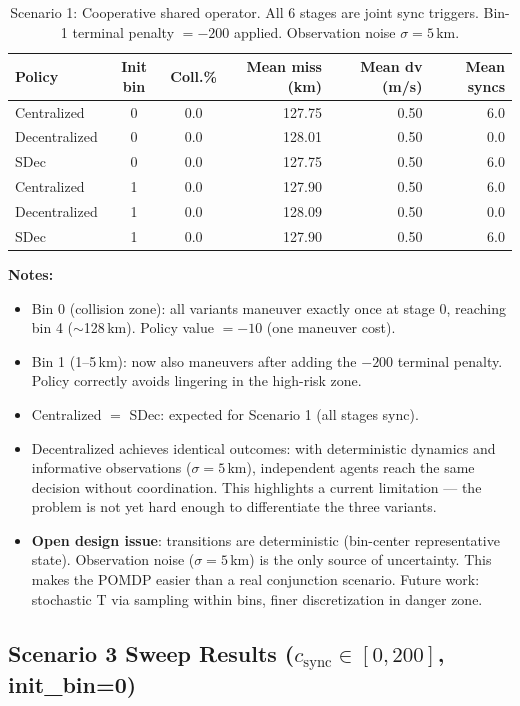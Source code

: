 \documentclass[11pt]{article}
\begin{document}
\begin{table}[h]
\centering
\caption{Scenario 1: Cooperative shared operator. All 6 stages are joint sync triggers.
  Bin-1 terminal penalty $= -200$ applied. Observation noise $\sigma = 5$\,km.}
\begin{tabular}{lccrrr}
\toprule
Policy & Init bin & Coll.\% & Mean miss (km) & Mean dv (m/s) & Mean syncs \\
\midrule
Centralized   & 0 & 0.0 & 127.75 & 0.50 & 6.0 \\
Decentralized & 0 & 0.0 & 128.01 & 0.50 & 0.0 \\
SDec          & 0 & 0.0 & 127.75 & 0.50 & 6.0 \\
\midrule
Centralized   & 1 & 0.0 & 127.90 & 0.50 & 6.0 \\
Decentralized & 1 & 0.0 & 128.09 & 0.50 & 0.0 \\
SDec          & 1 & 0.0 & 127.90 & 0.50 & 6.0 \\
\bottomrule
\end{tabular}
\end{table}

\noindent\textbf{Notes:}
\begin{itemize}
  \item Bin 0 (collision zone): all variants maneuver exactly once at stage 0, reaching
        bin 4 ($\sim$128\,km). Policy value $= -10$ (one maneuver cost).
  \item Bin 1 (1--5\,km): now also maneuvers after adding the $-200$ terminal penalty.
        Policy correctly avoids lingering in the high-risk zone.
  \item Centralized $=$ SDec: expected for Scenario 1 (all stages sync).
  \item Decentralized achieves identical outcomes: with deterministic dynamics and
        informative observations ($\sigma=5$\,km), independent agents reach the same
        decision without coordination. This highlights a current limitation ---
        the problem is not yet hard enough to differentiate the three variants.
  \item \textbf{Open design issue}: transitions are deterministic (bin-center representative
        state). Observation noise ($\sigma=5$\,km) is the only source of uncertainty.
        This makes the POMDP easier than a real conjunction scenario. Future work:
        stochastic T via sampling within bins, finer discretization in danger zone.
\end{itemize}

\subsection*{Scenario 3 Sweep Results ($c_\text{sync} \in [0, 200]$, init\_bin=0)}
\end{document}
